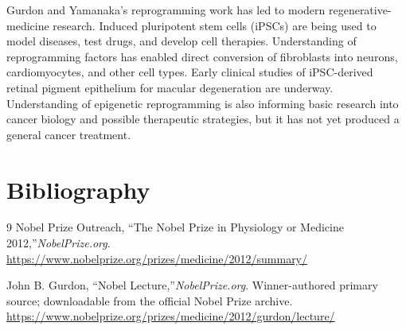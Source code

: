 Gurdon and Yamanaka's reprogramming work has led to modern regenerative-medicine research. Induced pluripotent stem cells (iPSCs) are being used to model diseases, test drugs, and develop cell therapies. Understanding of reprogramming factors has enabled direct conversion of fibroblasts into neurons, cardiomyocytes, and other cell types. Early clinical studies of iPSC-derived retinal pigment epithelium for macular degeneration are underway. Understanding of epigenetic reprogramming is also informing basic research into cancer biology and possible therapeutic strategies, but it has not yet produced a general cancer treatment.


\section{Bibliography}

\begin{thebibliography}{9}
Nobel Prize Outreach, ``The Nobel Prize in Physiology or Medicine 2012,''\emph{NobelPrize.org}.\\
\url{https://www.nobelprize.org/prizes/medicine/2012/summary/}

John B. Gurdon, ``Nobel Lecture,''\emph{NobelPrize.org}. Winner-authored primary source; downloadable from the official Nobel Prize archive.\\
\url{https://www.nobelprize.org/prizes/medicine/2012/gurdon/lecture/}
\end{thebibliography}
